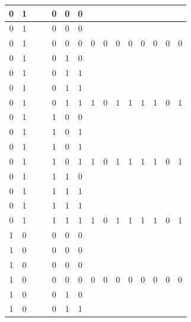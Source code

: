 \begin{table}[!tb]
\begin{tabular}{|c|c|c|c|c|c|c|c|c|c|c|c|c|c|c|}
        \rowcolor{yellow!40} 0 & 1 &  &  & 0 & 0 & 0 &  &  &  &  &  &  &  &  \\ \hline
        \rowcolor{yellow!40} 0 & 1 &  &  & 0 & 0 & 0 &  &  &  &  &  &  &  &  \\ \hline
        \rowcolor{yellow!40} 0 & 1 &  &  & 0 & 0 & 0 & 0 & 0 & 0 & 0 & 0 & 0 & 0 & 0 \\ \hline
        \rowcolor{gray!40} 0 & 1 &  &  & 0 & 1 & 0 &  &  &  &  &  &  &  &  \\ \hline
        \rowcolor{gray!40} 0 & 1 &  &  & 0 & 1 & 1 &  &  &  &  &  &  &  &  \\ \hline
        \rowcolor{gray!40} 0 & 1 &  &  & 0 & 1 & 1 &  &  &  &  &  &  &  &  \\ \hline
        \rowcolor{gray!40} 0 & 1 &  &  & 0 & 1 & 1 & 1 & 0 & 1 & 1 & 1 & 1 & 0 & 1 \\ \hline
        \rowcolor{blue!40} 0 & 1 &  &  & 1 & 0 & 0 &  &  &  &  &  &  &  &  \\ \hline
        \rowcolor{blue!40} 0 & 1 &  &  & 1 & 0 & 1 &  &  &  &  &  &  &  &  \\ \hline
        \rowcolor{blue!40} 0 & 1 &  &  & 1 & 0 & 1 &  &  &  &  &  &  &  &  \\ \hline
        \rowcolor{blue!40} 0 & 1 &  &  & 1 & 0 & 1 & 1 & 0 & 1 & 1 & 1 & 1 & 0 & 1 \\ \hline
        \rowcolor{red!40} 0 & 1 &  &  & 1 & 1 & 0 &  &  &  &  &  &  &  &  \\ \hline
        \rowcolor{red!40} 0 & 1 &  &  & 1 & 1 & 1 &  &  &  &  &  &  &  &  \\ \hline
        \rowcolor{red!40} 0 & 1 &  &  & 1 & 1 & 1 &  &  &  &  &  &  &  &  \\ \hline
        \rowcolor{red!40} 0 & 1 &  &  & 1 & 1 & 1 & 1 & 0 & 1 & 1 & 1 & 1 & 0 & 1 \\ \hline
        \rowcolor{green!40} 1 & 0 &  &  & 0 & 0 & 0 &  &  &  &  &  &  &  &  \\ \hline
        \rowcolor{green!40} 1 & 0 &  &  & 0 & 0 & 0 &  &  &  &  &  &  &  &  \\ \hline
        \rowcolor{green!40} 1 & 0 &  &  & 0 & 0 & 0 &  &  &  &  &  &  &  &  \\ \hline
        \rowcolor{green!40} 1 & 0 &  &  & 0 & 0 & 0 & 0 & 0 & 0 & 0 & 0 & 0 & 0 & 0 \\ \hline
        \rowcolor{yellow!40} 1 & 0 &  &  & 0 & 1 & 0 &  &  &  &  &  &  &  &  \\ \hline
        \rowcolor{yellow!40} 1 & 0 &  &  & 0 & 1 & 1 &  &  &  &  &  &  &  &  \\ \hline

\end{tabular}
\end{table}
